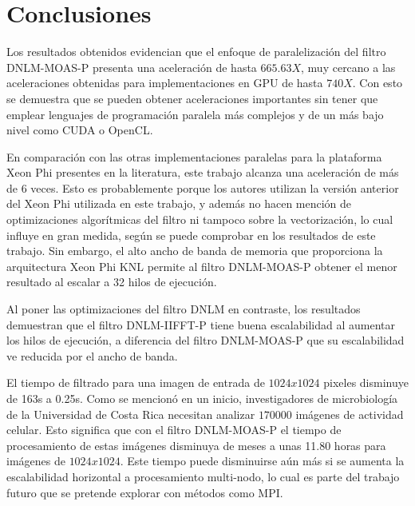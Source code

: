 \chapter{Conclusiones}
\label{ch:concl}

Los resultados obtenidos evidencian que el enfoque de paralelizaci\'on del filtro DNLM-MOAS-P presenta una aceleraci\'on de hasta $665.63X$, muy cercano a las aceleraciones obtenidas para implementaciones en GPU de hasta $740X$. Con esto se demuestra que se pueden obtener aceleraciones importantes sin tener que emplear lenguajes de programaci\'on paralela m\'as complejos y de un m\'as bajo nivel como CUDA o OpenCL.


En comparaci\'on con las otras implementaciones paralelas para la plataforma Xeon Phi presentes en la literatura, este trabajo alcanza una aceleraci\'on de m\'as de 6 veces. Esto es probablemente porque los autores utilizan la versi\'on anterior del Xeon Phi utilizada en este trabajo, y adem\'as no hacen menci\'on de optimizaciones algor\'itmicas del filtro ni tampoco sobre la vectorizaci\'on, lo cual influye en gran medida, seg\'un se puede comprobar en los resultados de este trabajo. Sin embargo, el alto ancho de banda de memoria que proporciona la arquitectura Xeon Phi KNL permite al filtro DNLM-MOAS-P obtener el menor resultado al escalar a 32 hilos de ejecuci\'on.

Al poner las optimizaciones del filtro DNLM en contraste, los resultados demuestran que el filtro DNLM-IIFFT-P tiene buena escalabilidad al aumentar los hilos de ejecuci\'on, a diferencia del filtro DNLM-MOAS-P que su escalabilidad ve reducida por el ancho de banda. 


El tiempo de filtrado para una imagen de entrada de $1024x1024$ pixeles disminuye de 163s a 0.25s. Como se mencion\'o en un inicio, investigadores de microbiolog\'ia de la Universidad de Costa Rica necesitan analizar $170000$ im\'agenes de actividad celular. Esto significa que con el filtro DNLM-MOAS-P el tiempo de procesamiento de estas im\'agenes disminuya de meses a unas 11.80 horas para im\'agenes de $1024x1024$. Este tiempo puede disminuirse a\'un m\'as si se aumenta la escalabilidad horizontal a procesamiento multi-nodo, lo cual es parte del trabajo futuro que se pretende explorar con m\'etodos como MPI.


